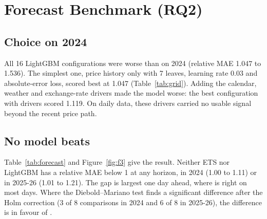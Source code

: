 \begin{table}[H]\centering\small
\caption[Changes before Ramadan]{Price changes in the 30 days before Ramadan against other days (five Ramadans, about 112 report days per item).}\label{tab:ramadan}
\fittab{}
\end{table}

\section{Forecast Benchmark (RQ2)}\label{sec:res-forecast}

\subsection{Choice on 2024}
All 16 LightGBM configurations were worse than \naive{} on 2024 (relative MAE 1.047 to 1.536). The simplest one, price history only with 7 leaves, learning rate 0.03 and absolute-error loss, scored best at 1.047 (Table~\ref{tab:grid}). Adding the calendar, weather and exchange-rate drivers made the model worse: the best configuration with drivers scored 1.119. On daily data, these drivers carried no usable signal beyond the recent price path.

\begin{table}[H]\centering\small
\caption[LightGBM configurations on 2024]{LightGBM configurations on 2024 (eight of the sixteen shown, including the best of each feature set; the full grid is in \texttt{M1\_validation\_grid.csv}). Relative MAE is the geometric mean over items of MAE / MAE of \naive{}; above 1 is worse than \naive{}.}\label{tab:grid}
\fittab{}
\end{table}

\subsection{No model beats \naive{}}
Table~\ref{tab:forecast} and Figure~\ref{fig:f3} give the result. Neither ETS nor LightGBM has a relative MAE below 1 at any horizon, in 2024 (1.00 to 1.11) or in 2025-26 (1.01 to 1.21). The gap is largest one day ahead, where \naive{} is right on most days. Where the Diebold--Mariano test finds a significant difference after the Holm correction (3 of 8 comparisons in 2024 and 6 of 8 in 2025-26), the difference is in favour of \naive{}.

